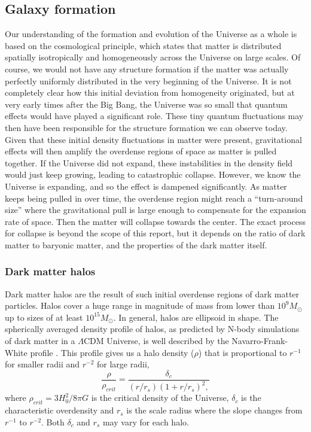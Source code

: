\subsection{Galaxy formation}

Our understanding of the formation and evolution of the Universe as a whole is based on the cosmological principle, which states that matter is distributed spatially isotropically and homogeneously across the Universe on large scales. Of course, we would not have any structure formation if the matter was actually perfectly uniformly distributed in the very beginning of the Universe. It is not completely clear how this initial deviation from homogeneity originated, but at very early times after the Big Bang, the Universe was so small that quantum effects would have played a significant role. These tiny quantum fluctuations may then have been responsible for the structure formation we can observe today. Given that these initial density fluctuations in matter were present, gravitational effects will then amplify the overdense regions of space as matter is pulled together. If the Universe did not expand, these instabilities in the density field would just keep growing, leading to catastrophic collapse. However, we know the Universe is expanding, and so the effect is dampened significantly. As matter keeps being pulled in over time, the overdense region might reach a ``turn-around size'' where the gravitational pull is large enough to compensate for the expansion rate of space. Then the matter will collapse towards the center. The exact process for collapse is beyond the scope of this report, but it depends on the ratio of dark matter to baryonic matter, and the properties of the dark matter itself. 

\subsubsection{Dark matter halos}
Dark matter halos are the result of such initial overdense regions of dark matter particles. Halos cover a huge range in magnitude of mass from lower than $10^9 M_{\odot}$ up to sizes of at least $10^{15} M_{\odot}$. In general, halos are ellipsoid in shape. The spherically averaged density profile of halos, as predicted by N-body simulations of dark matter in a $\Lambda$CDM Universe, is well described by the Navarro-Frank-White profile \parencite{Navarro1996}. This profile gives us a halo density ($\rho$) that is proportional to $r^{-1}$ for smaller radii and $r^{-2}$ for large radii,
\begin{equation}
    \frac{\rho}{\rho_{crit}} = \frac{\delta_c}{(r/r_s)(1+r/r_s)^2,}
\end{equation}
where $\rho_{crit} = 3H_0^2/8\pi G$ is the critical density of the Universe, $\delta_c$ is the characteristic overdensity and $r_s$ is the scale radius where the slope changes from $r^{-1}$ to $r^{-2}$. Both $\delta_c$ and $r_s$ may vary for each halo.

